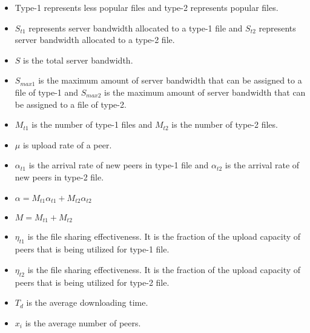 \begin{itemize}
\item Type-1 represents less popular files and type-2 represents popular files. 
\item $S_{t1}$ represents server bandwidth allocated to a type-1 file and $S_{t2}$ represents server bandwidth allocated to a type-2 file. 
\item $S$ is the total server bandwidth.
\item $S_{max1}$ is the maximum amount of server bandwidth that can be assigned to a file of type-1 and $S_{max2}$ is the maximum amount of server bandwidth that can be assigned to a file of type-2.
\item $M_{t1}$ is the number of type-1 files and $M_{t2}$ is the number of type-2 files.
\item $\mu$ is upload rate of a peer.
\item $\alpha_{t1}$ is the arrival rate of new peers in type-1 file and $\alpha_{t2}$ is the arrival rate of new peers in type-2 file.
\item $\alpha = M_{t1} \alpha_{t1} + M_{t2} \alpha_{t2}$
\item $M=M_{t1} + M_{t2}$ 
\item $\eta_{t1}$  is the file sharing effectiveness. It is the fraction of the upload capacity of peers that is being utilized for type-1 file.
\item $\eta_{t2}$  is the file sharing effectiveness. It is the fraction of the upload capacity of peers that is being utilized for type-2 file.
\item $T_d$ is the average downloading time. 
\item $x_i$ is the average number of peers.
\end{itemize}

